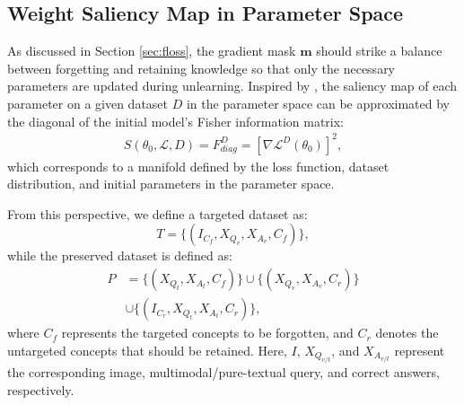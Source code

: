 \subsection{Weight Saliency Map in Parameter Space}
As discussed in Section \ref{sec:floss}, the gradient mask $\mathbf{m}$ should strike a balance between forgetting and retaining knowledge so that only the necessary parameters are updated during unlearning. Inspired by \citet{fan2023salun,huang2024remain}, the saliency map of each parameter on a given dataset $D$ in the parameter space can be approximated by the diagonal of the initial model’s Fisher information matrix:
\begin{equation}
\begin{split}
S(\theta_0, \mathcal{L}, D) = F_{diag}^D = [\nabla\mathcal{L}^D(\theta_0)]^2,
\end{split}
\end{equation}
which corresponds to a manifold defined by the loss function, dataset distribution, and initial parameters in the parameter space.

From this perspective, we define a targeted dataset as:
\begin{equation}
T = \{(I_{C_f}, X_{Q_v}, X_{A_v}, C_f)\},
\end{equation}
while the preserved dataset is defined as:
\begin{equation}\label{eq:pdata}
\begin{split}
P &= \{(X_{Q_t}, X_{A_t}, C_f)\}\cup \{(X_{Q_v}, X_{A_v}, C_r)\}\\ & \cup \{(I_{C_r}, X_{Q_t}, X_{A_t}, C_r)\},
\end{split}
\end{equation}
where $C_f$ represents the targeted concepts to be forgotten, and $C_r$ denotes the untargeted concepts that should be retained. Here, $I$, $X_{Q_{v/t}}$, and $X_{A_{v/t}}$ represent the corresponding image, multimodal/pure-textual query, and correct answers, respectively.


